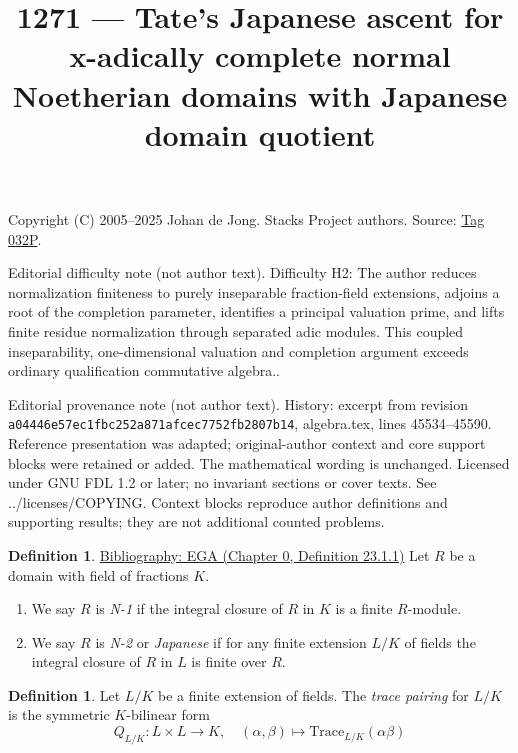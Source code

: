 \documentclass{amsart}
\newenvironment{reference}{\comment}{\endcomment}
\theoremstyle{plain}
\theoremstyle{definition}
\newtheorem{definition}[subsection]{Definition}
\theoremstyle{remark}
\numberwithin{equation}{subsection}
\begin{document}
\title[Stacks Project, Tag 032P]{1271 --- Tate's Japanese ascent for x-adically complete normal Noetherian domains with Japanese domain quotient}
\maketitle
\noindent Copyright (C) 2005--2025 Johan de Jong. Stacks Project authors. Source: \href{https://stacks.math.columbia.edu/tag/032P}{Tag 032P}.

\noindent Editorial difficulty note (not author text). Difficulty H2: The author reduces normalization finiteness to purely inseparable fraction-field extensions, adjoins a root of the completion parameter, identifies a principal valuation prime, and lifts finite residue normalization through separated adic modules. This coupled inseparability, one-dimensional valuation and completion argument exceeds ordinary qualification commutative algebra..

\noindent Editorial provenance note (not author text). History: excerpt from revision \texttt{a0444\allowbreak 6e57e\allowbreak c1fbc\allowbreak 252a8\allowbreak 71afc\allowbreak ec775\allowbreak 2fb28\allowbreak 07b14}, algebra.tex, lines 45534--45590. Reference presentation was adapted; original-author context and core support blocks were retained or added. The mathematical wording is unchanged. Licensed under GNU FDL 1.2 or later; no invariant sections or cover texts. See ../licenses/COPYING. Context blocks reproduce author definitions and supporting results; they are not additional counted problems.

\begin{definition}
\label{definition-N}
\begin{reference}
\href{https://stacks.math.columbia.edu/bibliography}{Bibliography: EGA (Chapter 0, Definition 23.1.1)}
\end{reference}
Let $R$ be a domain with field of fractions $K$.
\begin{enumerate}
\item We say $R$ is {\it N-1} if the integral closure of $R$ in $K$
is a finite $R$-module.
\item We say $R$ is {\it N-2} or {\it Japanese} if for any finite
extension $L/K$ of fields the integral closure of $R$ in $L$
is finite over $R$.
\end{enumerate}
\end{definition}

\begin{definition}
\label{fields-definition-trace-pairing}
Let $L/K$ be a finite extension of fields. The {\it trace pairing}
for $L/K$ is the symmetric $K$-bilinear form
$$
Q_{L/K} : L \times L \longrightarrow K,\quad
(\alpha, \beta) \longmapsto \text{Trace}_{L/K}(\alpha\beta)
$$
\end{definition}
\end{document}

